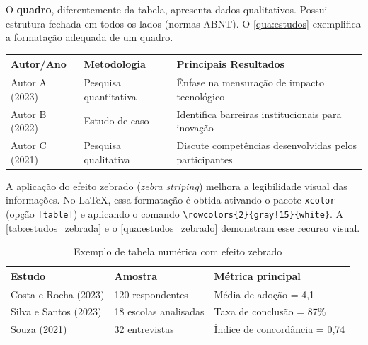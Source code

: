 O \textbf{quadro}, diferentemente da tabela, apresenta dados qualitativos. Possui estrutura fechada em todos os lados (normas ABNT). O \autoref{qua:estudos} exemplifica a formatação adequada de um quadro.

\begin{quadro}[htbp]
    \centering
    \caption{Exemplo de quadro com conteúdo qualitativo (Padrão ABNT)}
    \label{qua:estudos}
    \begin{tabularx}{\textwidth}{|p{3cm}|p{4cm}|X|}
        \hline
        \textbf{Autor/Ano} & \textbf{Metodologia} & \textbf{Principais Resultados} \\
        \hline
        Autor A (2023) & Pesquisa quantitativa & Ênfase na mensuração de impacto tecnológico \\ \hline
        Autor B (2022) & Estudo de caso & Identifica barreiras institucionais para inovação \\ \hline
        Autor C (2021) & Pesquisa qualitativa & Discute competências desenvolvidas pelos participantes \\ \hline
    \end{tabularx}
\end{quadro}

A aplicação do efeito zebrado (\textit{zebra striping}) melhora a legibilidade visual das informações. No LaTeX, essa formatação é obtida ativando o pacote \texttt{xcolor} (opção \texttt{[table]}) e aplicando o comando \verb|\rowcolors{2}{gray!15}{white}|. A \autoref{tab:estudos_zebrada} e o \autoref{qua:estudos_zebrado} demonstram esse recurso visual.

\begin{table}[htbp]
    \centering
    \caption{Exemplo de tabela numérica com efeito zebrado}
    \label{tab:estudos_zebrada}
    \begin{tabularx}{0.8\textwidth}{p{4cm}XX}
        \toprule
        \textbf{Estudo} & \textbf{Amostra} & \textbf{Métrica principal} \\
        \midrule
        Costa e Rocha (2023) & 120 respondentes & Média de adoção = 4,1 \\
        Silva e Santos (2023) & 18 escolas analisadas & Taxa de conclusão = 87\% \\
        Souza (2021) & 32 entrevistas & Índice de concordância = 0,74 \\
        \bottomrule
    \end{tabularx}
\end{table}

